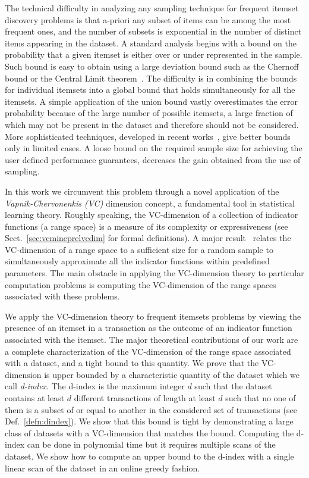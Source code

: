 The technical difficulty in analyzing any sampling technique for frequent
itemset discovery problems is that a-priori any subset of items can be among
the most frequent ones, and the number of subsets is exponential in the number
of distinct items appearing in the dataset. A standard analysis begins with a bound on
the probability that a given itemset is either over or under represented in the
sample. Such bound is easy to obtain using a large deviation bound such as the
Chernoff bound or the Central Limit theorem~\citep{MitzenmacherU05}. The
difficulty is in combining the bounds for individual itemsets
into a global bound that holds simultaneously for all the itemsets. A simple
application of the union bound vastly overestimates the error probability
because of the large number of possible itemsets, a large fraction of which may
not be present in the dataset and therefore should not be considered. More
sophisticated techniques, developed in recent
works~\citep{ChakaravarthyPS09,PietracaprinaRUV10,ChuangCY05}, give better
bounds only in limited cases. A loose bound 
 on the required sample size for achieving the user defined
 performance guarantees, decreases the gain obtained from the use of sampling. 

In this work we circumvent this problem 
through a novel application of the \emph{Vapnik-Chervonenkis (VC)} dimension
concept, a fundamental tool in statistical learning theory.  Roughly speaking,
the VC-dimension of a collection of indicator functions (a range space) is a
measure of its complexity or expressiveness (see Sect.~\ref{sec:vcmineprelvcdim} for
formal definitions). A major result~\citep{VapnikC71} relates the VC-dimension of
a range space to a sufficient size for a random sample to simultaneously
approximate all the indicator functions within predefined parameters. The main
obstacle in applying the VC-dimension theory to particular computation problems
is computing the VC-dimension of the range spaces associated with these
problems.  

We apply the VC-dimension theory to frequent itemsets problems by viewing the
presence of an itemset in a transaction as the outcome of an indicator function
associated with the itemset. The major theoretical contributions of our work are
a complete characterization of the VC-dimension of the range space associated
with a dataset, and a tight bound to this quantity. We prove that the VC-dimension
is upper bounded by a
characteristic quantity of the dataset
which we call \emph{d-index}. The d-index is the maximum integer $d$ such that the
dataset contains at least $d$ different transactions of length at least $d$ such
that no one of them is a subset of or equal to another in the considered set
of transactions (see Def.~\ref{defn:dindex}). We show that this bound is tight
by
demonstrating a large class of datasets with a VC-dimension that matches the
bound. Computing the d-index can be done in polynomial time but it requires
multiple scans of the dataset. We show how to compute an upper bound to the
d-index with a single linear scan of the dataset in an online greedy fashion.

